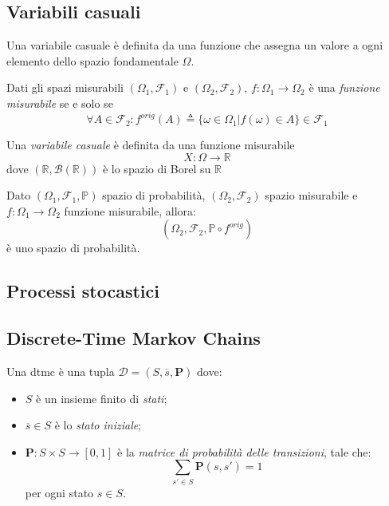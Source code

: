 \subsection{Variabili casuali}

Una variabile casuale è definita da una funzione che assegna un valore a ogni elemento dello spazio fondamentale $\Omega$.

\begin{mtdef}
	Dati gli spazi misurabili $(\Omega_1,\mathcal{F}_1)$ e $(\Omega_2,\mathcal{F}_2)$, $f:\Omega_1 \rightarrow \Omega_2$ è una \emph{funzione misurabile} se e solo se
	$$ \forall A \in \mathcal{F}_2 : f^{orig}(A) \triangleq \{\omega \in \Omega_1 | f(\omega) \in A \} \in \mathcal{F}_1 $$
\end{mtdef}

\begin{mtdef}
	Una \emph{variabile casuale} è definita da una funzione misurabile
	$$ X : \Omega \rightarrow \mathbb{R} $$
	dove $(\mathbb{R},\mathcal{B}(\mathbb{R}))$ è lo spazio di Borel su $\mathbb{R}$
\end{mtdef}

\begin{mtpro}
	Dato $(\Omega_1,\mathcal{F}_1,\mathbb{P})$ spazio di probabilità, $(\Omega_2,\mathcal{F}_2)$ spazio misurabile e $f:\Omega_1 \rightarrow \Omega_2$ funzione misurabile, allora:
	$$ (\Omega_2, \mathcal{F}_2, \mathbb{P} \circ f^{orig}) $$
	è uno spazio di probabilità.
\end{mtpro}

\subsection{Processi stocastici}

\subsection{Discrete-Time Markov Chains}

\begin{mtdef}
	Una \ac{dtmc} è una tupla $\mathcal{D} = (S,\overline{s},\mathbf{P})$ dove:
	\begin{itemize}
		\item $S$ è un insieme finito di \emph{stati};
		\item $\overline{s} \in S$ è lo \emph{stato iniziale};
		\item $\mathbf{P} : S \times S \rightarrow [0,1]$ è la \emph{matrice di probabilità delle transizioni}, tale che:
		$$ \sum_{s' \in S} \mathbf{P}(s,s') = 1$$
		per ogni stato $s \in S$.
	\end{itemize}
\end{mtdef}

